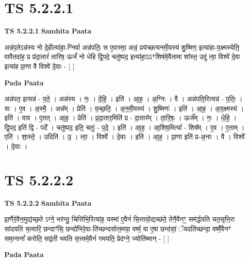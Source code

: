 \documentclass[17pt]{extarticle}
\begin{document}
\section*{ TS 5.2.2.1 }

\textbf{TS 5.2.2.1 } \newline
\textbf{Samhita Paata} \newline

अन्न॑प॒तेऽन्न॑स्य नो दे॒हीत्या॑हा॒-ग्निर्वा अन्न॑पतिः॒ स ए॒वास्मा॒ अन्नं॒ प्रय॑च्छत्यनमी॒वस्य॑ शु॒ष्मिण॒ इत्या॑हा-य॒क्ष्मस्येति॒ वावैतदा॑ह॒ प्र प्र॑दा॒तारं॑ तारिष॒ ऊर्जं॑ नो धेहि द्वि॒पदे॒ चतु॑ष्पद॒ इत्या॑हा॒ऽऽ*शिष॑मे॒वैतामा शा᳚स्त॒ उदु॑ त्वा॒ विश्वे॑ दे॒वा इत्या॑ह प्रा॒णा वै विश्वे॑ दे॒वाः - [  ] \newline

\textbf{Pada Paata} \newline

अन्न॑पत॒ इत्यन्न॑ - प॒ते॒ । अन्न॑स्य । नः॒ । दे॒हि॒ । इति॑ । आ॒ह॒ । अ॒ग्निः । वै । अन्न॑पति॒रित्यन्न॑ - प॒तिः॒ । सः । ए॒व । अ॒स्मै॒ । अन्न᳚म् । प्रेति॑ । य॒च्छ॒ति॒ । अ॒न॒मी॒वस्य॑ । शु॒ष्मिणः॑ । इति॑ । आ॒ह॒ । अ॒य॒क्ष्मस्य॑ । इति॑ । वाव । ए॒तत् । आ॒ह॒ । प्रेति॑ । प्र॒दा॒तार॒मिति॑ प्र - दा॒तार᳚म् । ता॒रि॒षः॒ । ऊर्ज᳚म् । नः॒ । धे॒हि॒ । द्वि॒पद॒ इति॑ द्वि - पदे᳚ । चतु॑ष्पद॒ इति॒ चतुः॑ - प॒दे॒ । इति॑ । आ॒ह॒ । आ॒शिष॒मित्या᳚ - शिष᳚म् । ए॒व । ए॒ताम् । एति॑ । शा॒स्ते॒ । उदिति॑ । उ॒ । त्वा॒ । विश्वे᳚ । दे॒वाः । इति॑ । आ॒ह॒ । प्रा॒णा इति॑ प्र-अ॒नाः । वै । विश्वे᳚ । दे॒वाः ।  \newline




\section*{ TS 5.2.2.2 }

\textbf{TS 5.2.2.2 } \newline
\textbf{Samhita Paata} \newline

प्रा॒णैरे॒वैन॒मुद्य॑च्छ॒ते ऽग्ने॒ भर॑न्तु॒ चित्ति॑भि॒रित्या॑ह॒ यस्मा॑ ए॒वैनं॑ चि॒त्तायो॒द्यच्छ॑ते॒ तेनै॒वैनꣳ॒॒ सम॑र्द्धयति चत॒सृभि॒रा सा॑दयति च॒त्वारि॒ छन्दाꣳ॑सि॒ छन्दो॑भिरे॒वा-ति॑च्छन्दसोत्त॒मया॒ वर्ष्म॒ वा ए॒षा छन्द॑सां॒ ॅयदति॑च्छन्दा॒ वर्ष्मै॒वैनꣳ॑ समा॒नानां᳚ करोति॒ सद्व॑ती भवति स॒त्त्वमे॒वैनं॑ गमयति॒ प्रेद॑ग्ने॒ ज्योति॑ष्मान् - [  ] \newline

\textbf{Pada Paata} \newline
\end{document}
